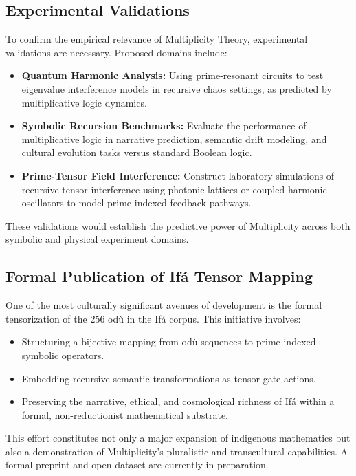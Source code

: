 \documentclass{article}
\theoremstyle{plain}
\begin{document}
\subsection{Experimental Validations}

To confirm the empirical relevance of Multiplicity Theory, experimental validations are necessary. Proposed domains include:

\begin{itemize}
    \item \textbf{Quantum Harmonic Analysis:} Using prime-resonant circuits to test eigenvalue interference models in recursive chaos settings, as predicted by multiplicative logic dynamics.
    
    \item \textbf{Symbolic Recursion Benchmarks:} Evaluate the performance of multiplicative logic in narrative prediction, semantic drift modeling, and cultural evolution tasks versus standard Boolean logic.
    
    \item \textbf{Prime-Tensor Field Interference:} Construct laboratory simulations of recursive tensor interference using photonic lattices or coupled harmonic oscillators to model prime-indexed feedback pathways.
\end{itemize}

These validations would establish the predictive power of Multiplicity across both symbolic and physical experiment domains.

\subsection{Formal Publication of Ifá Tensor Mapping}

One of the most culturally significant avenues of development is the formal tensorization of the 256 odù in the Ifá corpus. This initiative involves:

\begin{itemize}
    \item Structuring a bijective mapping from odù sequences to prime-indexed symbolic operators.
    \item Embedding recursive semantic transformations as tensor gate actions.
    \item Preserving the narrative, ethical, and cosmological richness of Ifá within a formal, non-reductionist mathematical substrate.
\end{itemize}

This effort constitutes not only a major expansion of indigenous mathematics but also a demonstration of Multiplicity’s pluralistic and transcultural capabilities. A formal preprint and open dataset are currently in preparation.
\end{document}
